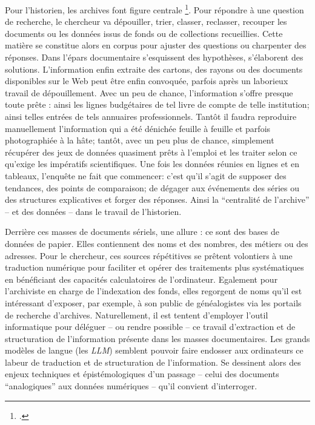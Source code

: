 Pour l'historien, les archives font figure centrale \footcite{boutier}. Pour répondre à une question de recherche, le chercheur va dépouiller, trier, classer, reclasser, recouper les documents ou les données issus de fonds ou de collections recueillies. Cette matière se constitue alors en corpus pour ajuster des questions ou charpenter des réponses. Dans l'épars documentaire s'esquissent des hypothèses, s'élaborent des solutions. L'information enfin extraite des cartons, des rayons ou des documents disponibles sur le Web peut être enfin convoquée, parfois après un laborieux travail de dépouillement. Avec un peu de chance, l'information s'offre presque toute prête : ainsi les lignes budgétaires de tel livre de compte de telle institution; ainsi telles entrées de tels annuaires professionnels. Tantôt il faudra reproduire manuellement l'information qui a été dénichée feuille à feuille et parfois photographiée à la hâte; tantôt, avec un peu plus de chance, simplement récupérer des jeux de données quasiment prêts à l'emploi et les traiter selon ce qu'exige les impératifs scientifiques. Une fois les données réunies en lignes et en tableaux, l'enquête ne fait que commencer: c'est qu'il s'agit de supposer des tendances, des points de comparaison; de dégager aux événements des séries ou des structures explicatives et forger des réponses. Ainsi la \enquote{centralité de l'archive} -- et des données -- dans le travail de l'historien.

Derrière ces masses de documents sériels, une allure : ce sont des bases de données de papier. Elles contiennent des noms et des nombres, des métiers ou des adresses. Pour le chercheur, ces sources répétitives se prêtent volontiers à une traduction numérique pour faciliter et opérer des traitements plus systématiques en bénéficiant des capacités calculatoires de l'ordinateur. Egalement pour l'archiviste en charge de l'indexation des fonds, elles regorgent de noms qu'il est intéressant d'exposer, par exemple, à son public de généalogistes via les portails de recherche d'archives. Naturellement, il est tentent d'employer l'outil informatique pour déléguer -- ou rendre possible -- ce travail d'extraction et de structuration de l'information présente dans les masses documentaires. Les grands modèles de langue (les \textit{LLM}) semblent pouvoir faire endosser aux ordinateurs ce labeur de traduction et de structuration de l'information. Se dessinent alors des enjeux techniques et épistémologiques d'un passage -- celui des documents \enquote{analogiques} aux données numériques -- qu'il convient d'interroger. 

